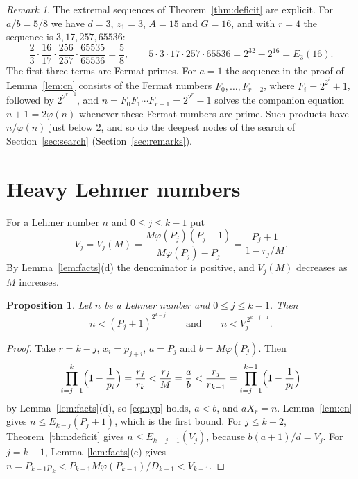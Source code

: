 \documentclass[11pt,reqno]{amsart}
\numberwithin{equation}{section}
\theoremstyle{plain}
\newtheorem{proposition}[theorem]{Proposition}
\theoremstyle{definition}
\theoremstyle{remark}
\newtheorem{remark}[theorem]{Remark}
\begin{document}
\begin{remark}\label{rem:fermat}
The extremal sequences of Theorem~\ref{thm:deficit} are explicit. For
$a/b=5/8$ we have $d=3$, $z_1=3$, $A=15$ and $G=16$, and with
$r=4$ the sequence is $3,17,257,65536$:
\[
  \frac23\cdot\frac{16}{17}\cdot\frac{256}{257}\cdot\frac{65535}{65536}
  =\frac58,\qquad
  5\cdot3\cdot17\cdot257\cdot65536=2^{32}-2^{16}=E_3(16).
\]
The first three terms are Fermat primes. For $a=1$ the sequence in the
proof of Lemma~\ref{lem:cn} consists of the Fermat numbers
$F_0,\dots,F_{r-2}$, where $F_i=2^{2^i}+1$, followed by $2^{2^{r-1}}$,
and $n=F_0F_1\cdots F_{r-1}=2^{2^r}-1$ solves the companion equation
$n+1=2\varphi(n)$ whenever these Fermat numbers are prime. Such
products have $n/\varphi(n)$ just below $2$, and so do the deepest
nodes of the search of Section~\ref{sec:search}
(Section~\ref{sec:remarks}).
\end{remark}

\section{Heavy Lehmer numbers}\label{sec:heavy}

For a Lehmer number $n$ and $0\le j\le k-1$ put
\begin{equation}\label{eq:V}
  V_j=V_j(M)=\frac{M\varphi(P_j)(P_j+1)}{M\varphi(P_j)-P_j}
  =\frac{P_j+1}{1-r_j/M}.
\end{equation}
By Lemma~\ref{lem:facts}(d) the denominator is positive, and $V_j(M)$
decreases as $M$ increases.

\begin{proposition}\label{prop:bounds}
Let $n$ be a Lehmer number and $0\le j\le k-1$. Then
\[
  n<(P_j+1)^{2^{k-j}}\qquad\text{and}\qquad n<V_j^{\,2^{k-j-1}} .
\]
\end{proposition}

\begin{proof}
Take $r=k-j$, $x_i=p_{j+i}$, $a=P_j$ and $b=M\varphi(P_j)$. Then
\[
  \prod_{i=j+1}^{k}\Bigl(1-\frac1{p_i}\Bigr)=\frac{r_j}{r_k}
  <\frac{r_j}{M}=\frac ab<\frac{r_j}{r_{k-1}}
  =\prod_{i=j+1}^{k-1}\Bigl(1-\frac1{p_i}\Bigr)
\]
by Lemma~\ref{lem:facts}(d), so \eqref{eq:hyp} holds, $a<b$, and
$aX_r=n$. Lemma~\ref{lem:cn} gives $n\le E_{k-j}(P_j+1)$, which is the
first bound. For $j\le k-2$, Theorem~\ref{thm:deficit} gives
$n\le E_{k-j-1}(V_j)$, because $b(a+1)/d=V_j$. For $j=k-1$,
Lemma~\ref{lem:facts}(e) gives
$n=P_{k-1}p_k<P_{k-1}M\varphi(P_{k-1})/D_{k-1}<V_{k-1}$.
\end{proof}
\end{document}

